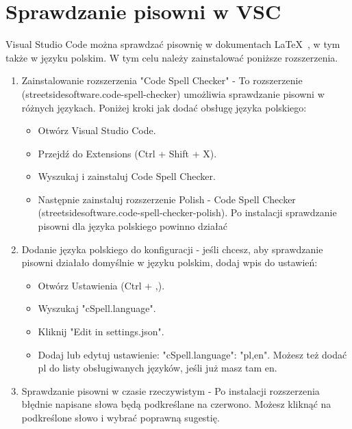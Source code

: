 \section{Sprawdzanie pisowni w VSC}

Visual Studio Code można sprawdzać pisownię w dokumentach \LaTeX~, w tym także w języku polskim. W tym celu należy zainstalować poniższe rozszerzenia.
\begin{enumerate}
      \item Zainstalowanie rozszerzenia "Code Spell Checker" - To rozszerzenie (streetsidesoftware.code-spell-checker) umożliwia sprawdzanie pisowni w różnych językach. Poniżej kroki jak dodać obsługę języka polskiego:
      \begin{itemize}
            \item Otwórz Visual Studio Code.
            \item Przejdź do Extensions (Ctrl + Shift + X).
            \item Wyszukaj i zainstaluj Code Spell Checker.
            \item Następnie zainstaluj rozszerzenie Polish - Code Spell Checker (streetsidesoftware.code-spell-checker-polish). Po instalacji sprawdzanie pisowni dla języka polskiego powinno działać
      \end{itemize}
      \item Dodanie języka polskiego do konfiguracji - jeśli chcesz, aby sprawdzanie pisowni działało domyślnie w języku polskim, dodaj wpis do ustawień:
      \begin{itemize}
            \item Otwórz Ustawienia (Ctrl + ,).
            \item Wyszukaj "cSpell.language".
            \item Kliknij "Edit in settings.json".
            \item Dodaj lub edytuj ustawienie: "cSpell.language": "pl,en". Możesz też dodać pl do listy obsługiwanych języków, jeśli już masz tam en.
      \end{itemize} 
      \item Sprawdzanie pisowni w czasie rzeczywistym  - Po instalacji rozszerzenia błędnie napisane słowa będą podkreślane na czerwono. Możesz kliknąć na podkreślone słowo i wybrać poprawną sugestię.
\end{enumerate}

